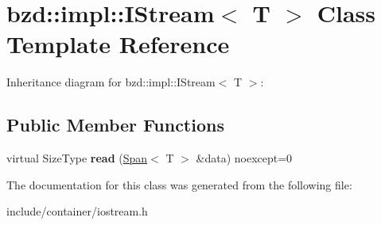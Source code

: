 \hypertarget{classbzd_1_1impl_1_1IStream}{}\section{bzd\+:\+:impl\+:\+:I\+Stream$<$ T $>$ Class Template Reference}
\label{classbzd_1_1impl_1_1IStream}


Inheritance diagram for bzd\+:\+:impl\+:\+:I\+Stream$<$ T $>$\+:
\subsection*{Public Member Functions}
\begin{DoxyCompactItemize}
\item 
\mbox{\label{classbzd_1_1impl_1_1IStream_a3ac29168e430557e9b13b116e5f369a6}} 
virtual Size\+Type {\bfseries read} (\hyperlink{classbzd_1_1Span}{Span}$<$ T $>$ \&data) noexcept=0
\end{DoxyCompactItemize}


The documentation for this class was generated from the following file\+:\begin{DoxyCompactItemize}
\item 
include/container/iostream.\+h\end{DoxyCompactItemize}
